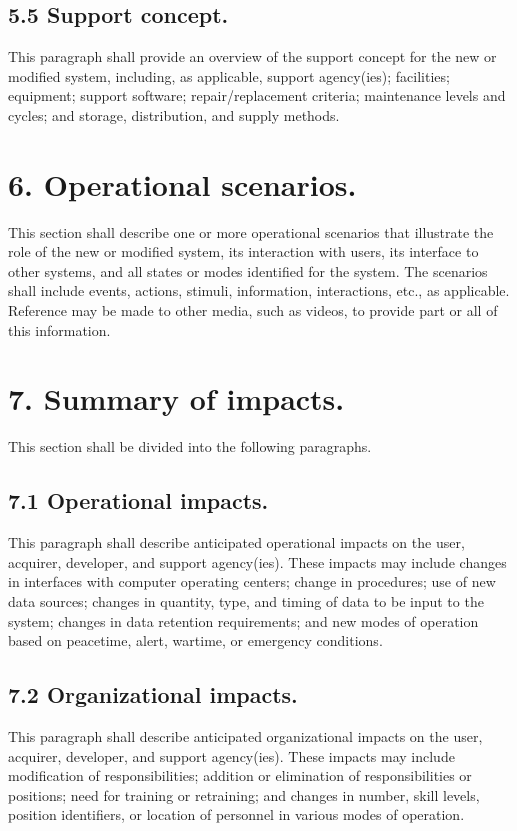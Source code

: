 \subsection{5.5 Support concept.}

This paragraph shall provide an overview of the support concept for the
new or modified system, including, as applicable, support agency(ies);
facilities; equipment; support software; repair/replacement criteria;
maintenance levels and cycles; and storage, distribution, and supply
methods.

\section{6. Operational scenarios.}

This section shall describe one or more operational scenarios that
illustrate the role of the new or modified system, its interaction with
users, its interface to other systems, and all states or modes
identified for the system. The scenarios shall include events, actions,
stimuli, information, interactions, etc., as applicable. Reference may
be made to other media, such as videos, to provide part or all of this
information.

\section{7. Summary of impacts.}

This section shall be divided into the following paragraphs.

\subsection{7.1 Operational impacts.}

This paragraph shall describe anticipated operational impacts on the
user, acquirer, developer, and support agency(ies). These impacts may
include changes in interfaces with computer operating centers; change in
procedures; use of new data sources; changes in quantity, type, and
timing of data to be input to the system; changes in data retention
requirements; and new modes of operation based on peacetime, alert,
wartime, or emergency conditions.

\subsection{7.2 Organizational impacts.}

This paragraph shall describe anticipated organizational impacts on the
user, acquirer, developer, and support agency(ies). These impacts may
include modification of responsibilities; addition or elimination of
responsibilities or positions; need for training or retraining; and
changes in number, skill levels, position identifiers, or location of
personnel in various modes of operation.

